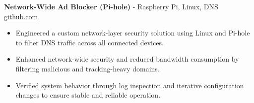 \documentclass[11pt]{article}       %
\begin{document}

\textbf{Network-Wide Ad Blocker (Pi-hole)}{ - Raspberry Pi, Linux, DNS} \hfill \href{https://github.com/Monica20030707}{github.com} \\
\vspace{-9pt}
\begin{itemize}
  \item Engineered a custom network-layer security solution using Linux and Pi-hole to filter DNS traffic across all connected devices.
  \item Enhanced network-wide security and reduced bandwidth consumption by filtering malicious and tracking-heavy domains.
  \item Verified system behavior through log inspection and iterative configuration changes to ensure stable and reliable operation.
\end{itemize}

\end{document}
